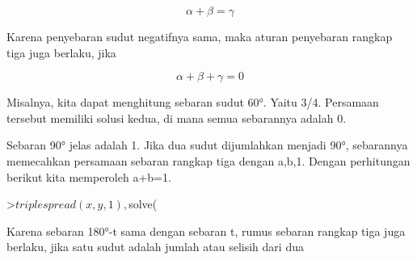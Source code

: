 \documentclass[a4paper,10pt]{article}
\begin{document}
\begin{eulernotebook}
\begin{eulercomment}
\begin{eulercomment}
\begin{eulercomment}
\begin{eulercomment}
\begin{eulercomment}
\begin{eulercomment}
\begin{eulercomment}
\begin{eulercomment}
\begin{eulercomment}
\begin{eulercomment}
\begin{eulercomment}
\begin{eulercomment}
\begin{eulercomment}
\begin{eulercomment}
\begin{eulercomment}
\begin{eulercomment}
\begin{eulercomment}
\begin{eulercomment}
\begin{eulercomment}
\begin{eulercomment}
\begin{eulercomment}
\begin{eulercomment}
\begin{eulercomment}
\begin{eulercomment}
\begin{eulercomment}
\begin{eulercomment}
\begin{eulercomment}
\begin{eulercomment}
\begin{eulercomment}
\begin{eulercomment}
\begin{eulercomment}
\begin{eulercomment}
\begin{eulercomment}
\begin{eulercomment}
\begin{eulercomment}
\begin{eulercomment}
\begin{eulercomment}
\begin{eulercomment}
\begin{eulercomment}
\begin{eulercomment}
\begin{eulercomment}
\end{eulercomment}
\begin{eulerformula}
\[
\alpha+\beta=\gamma
\]
\end{eulerformula}
\begin{eulercomment}
Karena penyebaran sudut negatifnya sama, maka aturan penyebaran
rangkap tiga juga berlaku, jika

\end{eulercomment}
\begin{eulerformula}
\[
\alpha+\beta+\gamma=0
\]
\end{eulerformula}
\begin{eulercomment}
Misalnya, kita dapat menghitung sebaran sudut 60°. Yaitu 3/4.
Persamaan tersebut memiliki solusi kedua, di mana semua sebarannya
adalah 0.
\end{eulercomment}
\begin{eulercomment}
Sebaran 90° jelas adalah 1. Jika dua sudut dijumlahkan menjadi 90°,
sebarannya memecahkan persamaan sebaran rangkap tiga dengan a,b,1.
Dengan perhitungan berikut kita memperoleh a+b=1.
\end{eulercomment}
\begin{eulerprompt}
>$triplespread(x,y,1), $solve(%
\end{eulerprompt}
\begin{eulercomment}
Karena sebaran 180°-t sama dengan sebaran t, rumus sebaran rangkap
tiga juga berlaku, jika satu sudut adalah jumlah atau selisih dari dua

\end{eulercomment}
\end{eulercomment}
\end{eulercomment}
\end{eulercomment}
\end{eulercomment}
\end{eulercomment}
\end{eulercomment}
\end{eulercomment}
\end{eulercomment}
\end{eulercomment}
\end{eulercomment}
\end{eulercomment}
\end{eulercomment}
\end{eulercomment}
\end{eulercomment}
\end{eulercomment}
\end{eulercomment}
\end{eulercomment}
\end{eulercomment}
\end{eulercomment}
\end{eulercomment}
\end{eulercomment}
\end{eulercomment}
\end{eulercomment}
\end{eulercomment}
\end{eulercomment}
\end{eulercomment}
\end{eulercomment}
\end{eulercomment}
\end{eulercomment}
\end{eulercomment}
\end{eulercomment}
\end{eulercomment}
\end{eulercomment}
\end{eulercomment}
\end{eulercomment}
\end{eulercomment}
\end{eulercomment}
\end{eulercomment}
\end{eulercomment}
\end{eulercomment}
\end{eulernotebook}
\end{document}
